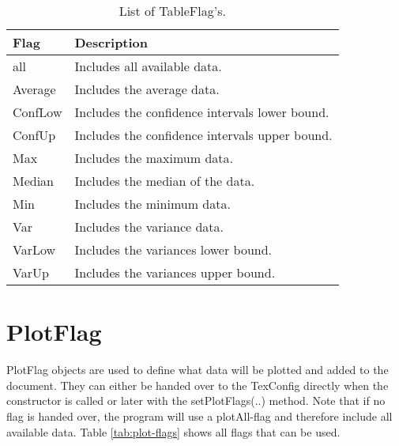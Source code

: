 \begin{table}[h]
\centering
\begin{tabular}[h]{|l|l|}\hline
	\textbf{Flag} & \textbf{Description}\\
	\hline
	all & Includes all available data.\\
	\hline
	Average & Includes the average data.\\
	\hline
	ConfLow & Includes the confidence intervals lower bound.\\
	\hline
	ConfUp & Includes the confidence intervals upper bound.\\
	\hline
	Max & Includes the maximum data.\\
	\hline
	Median & Includes the median of the data.\\
	\hline
	Min & Includes the minimum data.\\
	\hline
	Var & Includes the variance data.\\
	\hline
	VarLow & Includes the variances lower bound.\\
	\hline
	VarUp & Includes the variances upper bound.\\
	\hline
\end{tabular}
\caption{List of TableFlag's.}
\label{tab:table-flags}
\end{table}

\section{PlotFlag}
PlotFlag objects are used to define what data will be plotted and added to the document. They can either be handed over to the TexConfig directly when the constructor is called or later with the setPlotFlags(..) method. Note that if no flag is handed over, the program will use a plotAll-flag and therefore include all available data. Table \ref{tab:plot-flags} shows all flags that can be used.

